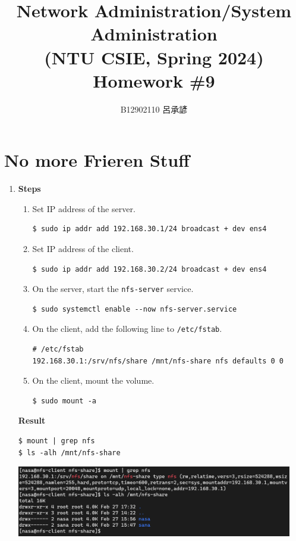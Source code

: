 \documentclass[12pt, a4paper]{article}
\title{
  \vspace{-1cm}
  Network Administration/System Administration\\
  (NTU CSIE, Spring 2024)\\
  Homework \#9
}
\author{\Large B12902110 呂承諺}
\begin{document}
  \maketitle
  \section{No more Frieren Stuff}
  \begin{enumerate}[label=(\alph*)]
    \item \textbf{Steps}
    \begin{enumerate}[label=(\arabic*)]
      \item Set IP address of the server.
      \begin{Verbatim}[frame=single]
$ sudo ip addr add 192.168.30.1/24 broadcast + dev ens4
      \end{Verbatim}

      \item Set IP address of the client.
      \begin{Verbatim}[frame=single]
$ sudo ip addr add 192.168.30.2/24 broadcast + dev ens4
      \end{Verbatim}

      \item On the server, start the \verb|nfs-server| service.
      \begin{Verbatim}[frame=single]
$ sudo systemctl enable --now nfs-server.service
      \end{Verbatim}

      \item On the client, add the following line to \verb|/etc/fstab|.
      \begin{Verbatim}[frame=single]
# /etc/fstab
192.168.30.1:/srv/nfs/share /mnt/nfs-share nfs defaults 0 0
      \end{Verbatim}

      \item On the client, mount the volume.
      \begin{Verbatim}[frame=single]
$ sudo mount -a
      \end{Verbatim}
    \end{enumerate}

    \textbf{Result}
    \begin{Verbatim}[frame=single]
$ mount | grep nfs
$ ls -alh /mnt/nfs-share
    \end{Verbatim}

    \includegraphics[width=0.95\textwidth]{1-a_result.png}


\end{enumerate}
\end{document}
